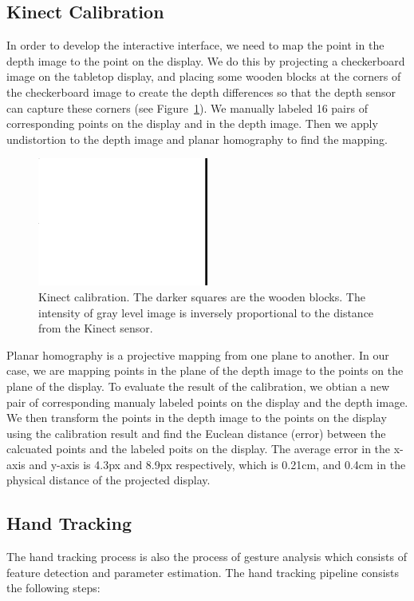 \subsection{Kinect Calibration}
In order to develop the interactive interface, we need to map the point in the
depth image to the point on the display. We do this by projecting a
checkerboard image on the tabletop display, and placing some wooden blocks at
the corners of the checkerboard image to create the depth differences so that 
the depth sensor can capture these corners (see Figure~\ref{fig:calibration}).
We manually labeled 16 pairs of corresponding points on the display and in the depth image. Then we
apply undistortion to the depth image and planar homography to find the mapping.

\begin{figure}[h]
  \centering
  \includegraphics[width=0.5\textwidth]{figures/calibration.png} 
  \caption{Kinect calibration. The darker squares are the wooden blocks. The
  intensity of gray level image is inversely proportional to the distance from
  the Kinect sensor.}
  \label{fig:calibration}
\end{figure}

Planar homography is a projective mapping from one plane to another. In our
case, we are mapping points in the plane of the depth image to the points
on the plane of the display. To evaluate the result of the calibration, we
obtian a new pair of corresponding manualy labeled points on the display and the
depth image. We then transform the points in the depth image to the points on
the display using the calibration result and find the Euclean distance
(error) between the calcuated points and the labeled poits on the display. The
average error in the x-axis and y-axis is 4.3px and 8.9px respectively, which is
0.21cm, and 0.4cm in the physical distance of the projected display.

\subsection{Hand Tracking}
The hand tracking process is also the process of gesture analysis which
consists of feature detection and parameter estimation. The hand tracking
pipeline consists the following steps:


